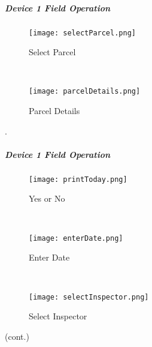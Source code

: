 \clearpage
\subparagraph{Device 1 Field Operation}

\begin{wrapfigure}{r}{0.5\textwidth}
\centering
    \texttt{[image: selectParcel.png]}
\caption {Select Parcel}
\vspace{.25in}

\HRule \\[.4cm] %
\vspace{.25in}

\centering
    \texttt{[image: parcelDetails.png]}
\caption{Parcel Details}
\end{wrapfigure}

.
\vspace{2.5in}

\vspace{4.5in}

\clearpage
\subparagraph*{Device 1 Field Operation}
\begin{wrapfigure}{r}{0.4\textwidth}
\centering
    \texttt{[image: printToday.png]}
\caption {Yes or No}
\vspace{.05in}

\HRule \\[.4cm] %
\vspace{.05in}

    \texttt{[image: enterDate.png]}
\caption{Enter Date}
\vspace{.05in}

\HRule \\[.4cm] %
\vspace{.05in}

    \texttt{[image: selectInspector.png]}
\caption{Select Inspector}
\end{wrapfigure}

(cont.)
\vspace{.8in}

\vspace{2in}

\vspace{3in}

